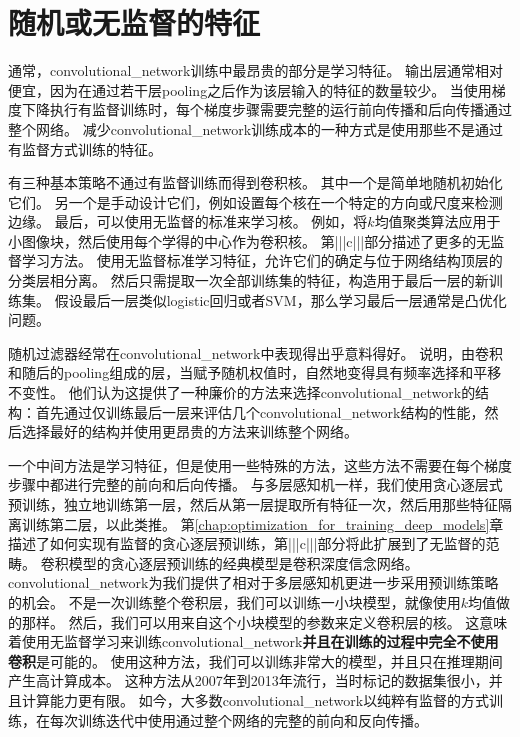 \section{随机或无监督的特征}
\label{sec:random_or_unsupervised_features}

通常，\gls{convolutional_network}训练中最昂贵的部分是学习特征。 
输出层通常相对便宜，因为在通过若干层\gls{pooling}之后作为该层输入的特征的数量较少。
当使用梯度下降执行有监督训练时，每个梯度步骤需要完整的运行前向传播和后向传播通过整个网络。
减少\gls{convolutional_network}训练成本的一种方式是使用那些不是通过有监督方式训练的特征。

有三种基本策略不通过有监督训练而得到卷积核。
其中一个是简单地随机初始化它们。
另一个是手动设计它们，例如设置每个核在一个特定的方向或尺度来检测边缘。
最后，可以使用无监督的标准来学习核。
例如，\cite{Coates2011}将$k$均值聚类算法应用于小图像块，然后使用每个学得的中心作为卷积核。
第|||c|||部分描述了更多的无监督学习方法。
使用无监督标准学习特征，允许它们的确定与位于网络结构顶层的分类层相分离。
然后只需提取一次全部训练集的特征，构造用于最后一层的新训练集。
假设最后一层类似logistic回归或者SVM，那么学习最后一层通常是凸优化问题。
 
 
随机过滤器经常在\gls{convolutional_network}中表现得出乎意料得好\cite{Jarrett-ICCV2009-small,Saxe-ICML2011,pinto2011scaling,cox2011beyond}。
\cite{Saxe-ICML2011}说明，由卷积和随后的\gls{pooling}组成的层，当赋予随机权值时，自然地变得具有频率选择和平移不变性。
他们认为这提供了一种廉价的方法来选择\gls{convolutional_network}的结构：首先通过仅训练最后一层来评估几个\gls{convolutional_network}结构的性能，然后选择最好的结构并使用更昂贵的方法来训练整个网络。

一个中间方法是学习特征，但是使用一些特殊的方法，这些方法不需要在每个梯度步骤中都进行完整的前向和后向传播。
与多层感知机一样，我们使用贪心逐层式预训练，独立地训练第一层，然后从第一层提取所有特征一次，然后用那些特征隔离训练第二层，以此类推。
第\ref{chap:optimization_for_training_deep_models}章描述了如何实现有监督的贪心逐层预训练，第|||c|||部分将此扩展到了无监督的范畴。
卷积模型的贪心逐层预训练的经典模型是卷积深度信念网络\citep{HonglakL2009}。
\gls{convolutional_network}为我们提供了相对于多层感知机更进一步采用预训练策略的机会。
不是一次训练整个卷积层，我们可以训练一小块模型，就像\cite{Coates2011}使用$k$均值做的那样。
然后，我们可以用来自这个小块模型的参数来定义卷积层的核。
这意味着使用无监督学习来训练\gls{convolutional_network}\textbf{并且在训练的过程中完全不使用卷积}是可能的。
使用这种方法，我们可以训练非常大的模型，并且只在推理期间产生高计算成本\citep{ranzato-cvpr-07-small,Jarrett-ICCV2009-small,koray-nips-10-small,icml2013_coates13}。
这种方法从2007年到2013年流行，当时标记的数据集很小，并且计算能力更有限。
如今，大多数\gls{convolutional_network}以纯粹有监督的方式训练，在每次训练迭代中使用通过整个网络的完整的前向和反向传播。
 
